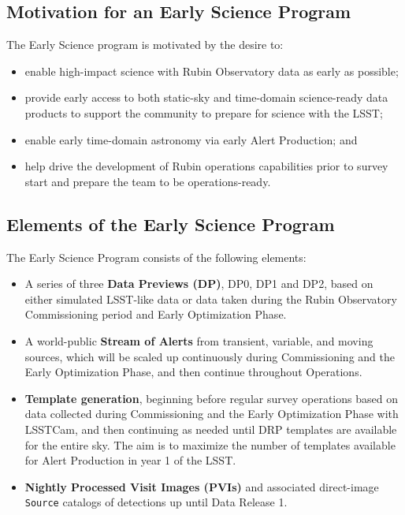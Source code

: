 \subsection{Motivation for an Early Science Program} 
 \label{ssec:motivation}
The Early Science program is motivated by the desire to:
\begin{itemize}
\item enable high-impact science with Rubin Observatory data as early as possible;
\item provide early access to both static-sky and time-domain science-ready data products to support the community to prepare for science with the LSST;
\item enable early time-domain astronomy via early Alert Production; and 
\item help drive the development of Rubin operations capabilities prior to survey start and prepare the team to be operations-ready.
\end{itemize}

\subsection{Elements of the Early Science Program}
 \label{ssec:elements}
The Early Science Program consists of the following elements:
\begin{itemize}
	\item A series of three \textbf{Data Previews (DP)}, DP0, DP1 and DP2,  based on either simulated LSST-like data or data taken during the Rubin Observatory Commissioning period and Early Optimization Phase. 
	\item A world-public \textbf{Stream of Alerts} from transient, variable, and moving sources, which will be scaled up continuously during Commissioning and the Early Optimization Phase, and then continue throughout Operations.
	\item  \textbf{Template generation}, beginning before regular survey operations based on data collected during  Commissioning and the Early Optimization Phase  with LSSTCam,  and then continuing as needed until DRP templates are available for the entire sky.
The aim is to maximize the number of templates available for Alert Production in year 1 of the LSST.
	\item \textbf{Nightly Processed Visit Images (PVIs)} and associated direct-image \texttt{Source} catalogs of detections up until  Data Release 1. 
\end{itemize}

